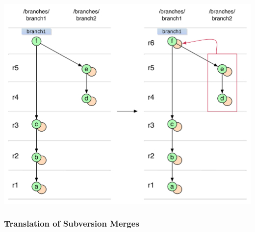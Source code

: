 \begin{center}
\includegraphics[width=\textwidth]{img/diagrams/simple_merge_branch_no_parent_git_to_svn.pdf}%
\label{simple_merge_branch_no_parent_git_to_svn}%
\end{center}

\subsubsection{Translation of Subversion Merges}

